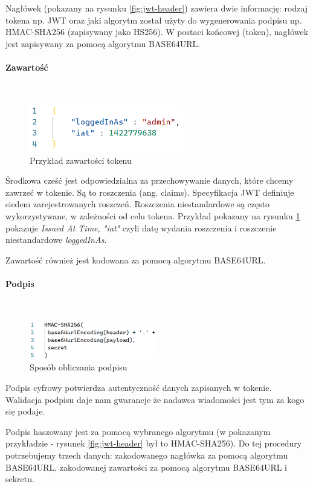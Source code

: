 \documentclass[12pt]{article}
\newcommand{\myparagraph}[1]{\paragraph{#1}\mbox{}\\}
\numberwithin{figure}{section}
\begin{document}
\begin{sloppypar}
    Nagłówek (pokazany na rysunku \ref{fig:jwt-header}) zawiera dwie informację: rodzaj tokena np. JWT oraz jaki algorytm został użyty do wygenerowania podpisu np. HMAC-SHA256 (zapisywany jako HS256). W postaci końcowej (token), nagłówek jest zapisywany za pomocą algorytmu BASE64URL.
    
    \myparagraph{Zawartość}
    \begin{figure}[H] 
     	\centering
    	\includegraphics[width=0.6\textwidth]{images/chapter_3/jwt-payload.png}
    	\caption{Przykład zawartości tokenu}
    	\label{fig:jwt-payload}
    \end{figure}
    
    Środkowa cześć jest odpowiedzialna za przechowywanie danych, które chcemy zawrzeć w tokenie. Są to roszczenia (ang. claims). Specyfikacja JWT definiuje siedem zarejestrowanych roszczeń. Roszczenia niestandardowe są często wykorzystywane, w zależności od celu tokena.
    Przykład pokazany na rysunku \ref{fig:jwt-payload} pokazuje \textit{Issued At Time, "iat"} czyli datę wydania roszczenia i roszczenie niestandardowe \textit{loggedInAs}.
    
    Zawartość również jest kodowana za pomocą algorytmu BASE64URL.
    \clearpage
    \myparagraph{Podpis}
    \label{signature}

    \begin{figure}[H] 
     	\centering
    	\includegraphics[width=0.5\textwidth]{images/chapter_3/jwt-signature.png}
    	\caption{Sposób obliczania podpisu}
    	\label{fig:jwt-signature}
    \end{figure}
    
    Podpis cyfrowy potwierdza autentyczność danych zapisanych w tokenie. Walidacja podpisu daje nam gwarancje że nadawca wiadomości jest tym za kogo się podaje.
    
    Podpis haszowany jest za pomocą wybranego algorytmu (w pokazanym przykładzie - rysunek \ref{fig:jwt-header} był to HMAC-SHA256). Do tej procedury potrzebujemy trzech danych: zakodowanego nagłówka za pomocą algorytmu BASE64URL, zakodowanej zawartości za pomocą algorytmu BASE64URL i sekretu. 
    

\end{sloppypar}
\end{document}
